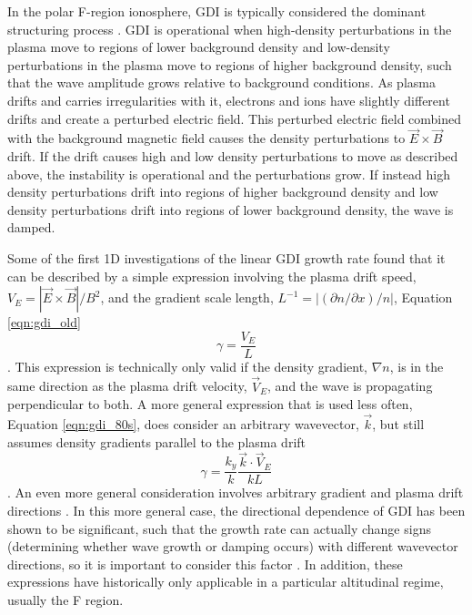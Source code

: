 In the polar F-region ionosphere, GDI is typically considered the dominant structuring process \citep{Weber1984,Cerisier1985,Basu1988,Tsunoda1988}.  GDI is operational when high-density perturbations in the plasma move to regions of lower background density and low-density perturbations in the plasma move to regions of higher background density, such that the wave amplitude grows relative to background conditions.  As plasma drifts and carries irregularities with it, electrons and ions have slightly different drifts and create a perturbed electric field.  This perturbed electric field combined with the background magnetic field causes the density perturbations to \(\vec{E}\times\vec{B}\) drift.  If the drift causes high and low density perturbations to move as described above, the instability is operational and the perturbations grow.  If instead high density perturbations drift into regions of higher background density and low density perturbations drift into regions of lower background density, the wave is damped.

Some of the first 1D investigations of the linear GDI growth rate found that it can be described by a simple expression involving the plasma drift speed, \(V_E = |\vec{E}\times\vec{B}|/B^2\), and the gradient scale length, \(L^{-1} = |(\partial n/\partial x)/n|\), Equation \ref{eqn:gdi_old} \citep{Simon1963,Hoh1963,Linson1970}
\begin{equation}
	\label{eqn:gdi_old}
	\gamma = \frac{V_E}{L}
\end{equation}.
This expression is technically only valid if the density gradient, \(\nabla n\), is in the same direction as the plasma drift velocity, \(\vec{V}_E\), and the wave is propagating perpendicular to both.  A more general expression that is used less often, Equation \ref{eqn:gdi_80s}, does consider an arbitrary wavevector, \(\vec{k}\), but still assumes density gradients parallel to the plasma drift \citep{Tsunoda1988}
\begin{equation}
	\label{eqn:gdi_80s}
	\gamma = \frac{k_y}{k}\frac{\vec{k}\cdot\vec{V}_E}{kL}
\end{equation}.
An even more general consideration involves arbitrary gradient and plasma drift directions \citep{Keskinen1982a,Makarevich2014c}.  In this more general case, the directional dependence of GDI has been shown to be significant, such that the growth rate can actually change signs (determining whether wave growth or damping occurs) with different wavevector directions, so it is important to consider this factor \citep{Makarevich2014c}.  In addition, these expressions have historically only applicable in a particular altitudinal regime, usually the F region.

